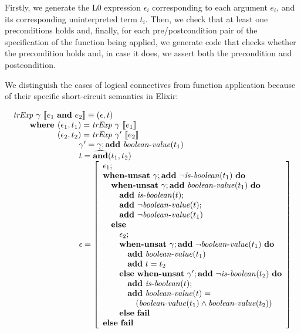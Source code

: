 Firstly, we generate the L0 expression $\epsilon_i$ corresponding to each 
argument $e_i$, and its corresponding uninterpreted term $t_i$. Then, we check 
that at least one preconditions holds and, finally, for each pre/postcondition
pair of the specification of the function being applied, we generate code that
checks whether the precondition holds and, in case it does, we assert both the
precondition and postcondition.

We distinguish the cases of logical connectives from function application
because of their specific short-circuit semantics in Elixir:

\[
\begin{array}{l}
\trExp{\gamma}{\andE{e_1}{e_2}} \equiv (\epsilon, t)\\
\qquad \textbf{where }(\epsilon_1, t_1) = \trExp{\gamma}{e_1}\\
\qquad \phantom{\textbf{where }}(\epsilon_2, t_2) = \trExp{\gamma'}{e_2}\\
\qquad\qquad\qquad\qquad \gamma' = \gamma;\addE~\booleanvalue{t_1}\\
\qquad\qquad\qquad\qquad t = \widehat{\mathbf{and}}(t_1, t_2)\\
\qquad\qquad\qquad\qquad \epsilon = \left[ 
\begin{array}{l}
\epsilon_1;\\
\whenUnsatW~\gamma;\addE~\neg\isboolean{t_1}~\doW\\
\quad\whenUnsatW~\gamma;\addE~\booleanvalue{t_1}~\doW\\
\quad\quad\addE~\isboolean{t};\\
\quad\quad\addE~\neg\booleanvalue{t};\\
\quad\quad\addE~\neg\booleanvalue{t_1}\\
\quad\elseW\\
\quad\quad\epsilon_2;\\
\quad\quad\whenUnsatW~\gamma;\addE~\neg\booleanvalue{t_1}~\doW\\
\quad\quad\quad\addE~\booleanvalue{t_1}\\
\quad\quad\quad\addE~t = t_2\\
\quad\quad\elseW~\whenUnsatW~\gamma';\addE~\neg\isboolean{t_2}~\doW\\
\quad\quad\quad\addE~\isboolean{t};\\
\quad\quad\quad\addE~\booleanvalue{t} = \\
\quad\quad\quad\quad(\booleanvalue{t_1} \land \booleanvalue{t_2})\\
\quad\quad\elseW~\failE\\
\elseW~\failE
\end{array}
\right] \\
\end{array}
\]


